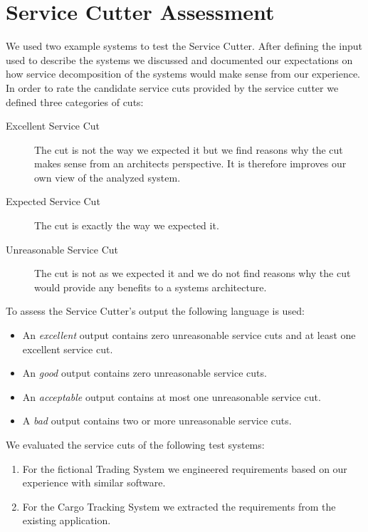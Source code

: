\chapter{Service Cutter Assessment}
\label{appendix:serviceCutterAssessment}

We used two example systems to test the Service Cutter. After defining the input used to describe the systems we discussed and documented our expectations on how service decomposition of the systems would make sense from our experience. In order to rate the candidate service cuts provided by the service cutter we defined three categories of cuts:

\begin{description}
	\item[Excellent Service Cut] The cut is not the way we expected it but we find reasons why the cut makes sense from an architects perspective. It is therefore improves our own view of the analyzed system.
	\item[Expected Service Cut] The cut is exactly the way we expected it. 
	\item[Unreasonable Service Cut] The cut is not as we expected it and we do not find reasons why the cut would provide any benefits to a systems architecture. 
\end{description}

To assess the Service Cutter's output the following language is used:

\begin{itemize}
	\item An \textit{excellent} output contains zero unreasonable service cuts and at least one excellent service cut.
	\item An \textit{good} output contains zero unreasonable service cuts.
	\item An \textit{acceptable} output contains at most one unreasonable service cut.
	\item A \textit{bad} output contains two or more unreasonable service cuts.
\end{itemize}

We evaluated the service cuts of the following test systems:

\begin{enumerate}
\item For the fictional Trading System we engineered requirements based on our experience with similar software.
\item For the Cargo Tracking System we extracted the requirements from the existing application.
\end{enumerate}

